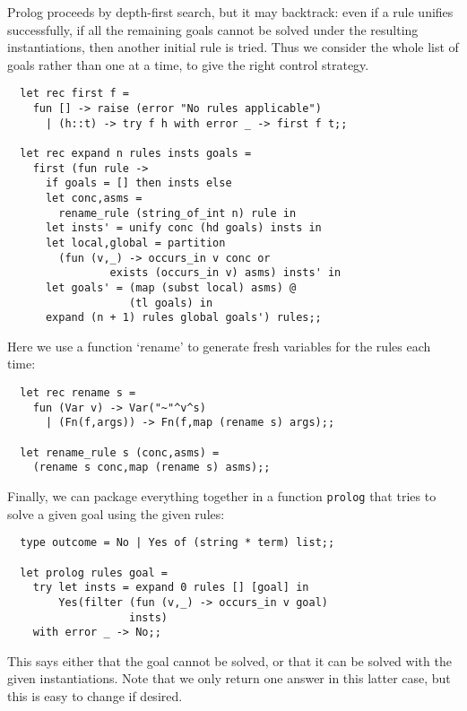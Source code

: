 Prolog proceeds by depth-first search, but it may backtrack: even if a rule
unifies successfully, if all the remaining goals cannot be solved under the
resulting instantiations, then another initial rule is tried. Thus we consider
the whole list of goals rather than one at a time, to give the right control
strategy.

\begin{boxed}\begin{verbatim}
  let rec first f =
    fun [] -> raise (error "No rules applicable")
      | (h::t) -> try f h with error _ -> first f t;;

  let rec expand n rules insts goals =
    first (fun rule ->
      if goals = [] then insts else
      let conc,asms =
        rename_rule (string_of_int n) rule in
      let insts' = unify conc (hd goals) insts in
      let local,global = partition
        (fun (v,_) -> occurs_in v conc or
                exists (occurs_in v) asms) insts' in
      let goals' = (map (subst local) asms) @
                   (tl goals) in
      expand (n + 1) rules global goals') rules;;
\end{verbatim}\end{boxed}

Here we use a function `rename' to generate fresh variables for the rules each
time:

\begin{boxed}\begin{verbatim}
  let rec rename s =
    fun (Var v) -> Var("~"^v^s)
      | (Fn(f,args)) -> Fn(f,map (rename s) args);;

  let rename_rule s (conc,asms) =
    (rename s conc,map (rename s) asms);;
\end{verbatim}\end{boxed}

Finally, we can package everything together in a function {\tt prolog} that
tries to solve a given goal using the given rules:

\begin{boxed}\begin{verbatim}
  type outcome = No | Yes of (string * term) list;;

  let prolog rules goal =
    try let insts = expand 0 rules [] [goal] in
        Yes(filter (fun (v,_) -> occurs_in v goal)
                   insts)
    with error _ -> No;;
\end{verbatim}\end{boxed}

This says either that the goal cannot be solved, or that it can be solved with
the given instantiations. Note that we only return one answer in this latter
case, but this is easy to change if desired.

